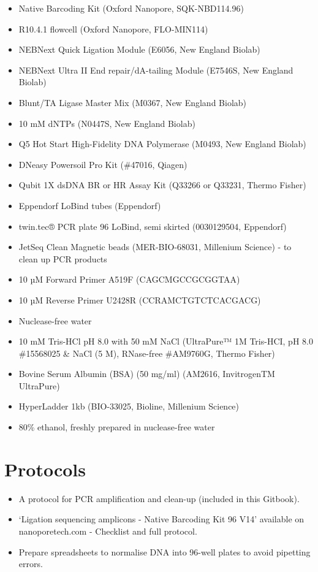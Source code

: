 \documentclass[
]{book}
\providecommand{\tightlist}{%
  \setlength{\itemsep}{0pt}\setlength{\parskip}{0pt}}
\begin{document}
\begin{itemize}
\tightlist
\item
  Native Barcoding Kit (Oxford Nanopore, SQK-NBD114.96)\\
\item
  R10.4.1 flowcell (Oxford Nanopore, FLO-MIN114)
\item
  NEBNext Quick Ligation Module (E6056, New England Biolab)
\item
  NEBNext Ultra II End repair/dA-tailing Module (E7546S, New England Biolab)
\item
  Blunt/TA Ligase Master Mix (M0367, New England Biolab)
\item
  10 mM dNTPs (N0447S, New England Biolab)
\item
  Q5 Hot Start High-Fidelity DNA Polymerase (M0493, New England Biolab)
\item
  DNeasy Powersoil Pro Kit (\#47016, Qiagen)
\item
  Qubit 1X dsDNA BR or HR Assay Kit (Q33266 or Q33231, Thermo Fisher)
\item
  Eppendorf LoBind tubes (Eppendorf)
\item
  twin.tec® PCR plate 96 LoBind, semi skirted (0030129504, Eppendorf)
\item
  JetSeq Clean Magnetic beads (MER-BIO-68031, Millenium Science) - to clean up PCR products
\item
  10 µM Forward Primer A519F (CAGCMGCCGCGGTAA) \citep{Martijn2019}
\item
  10 µM Reverse Primer U2428R (CCRAMCTGTCTCACGACG) \citep{Martijn2019}
\item
  Nuclease-free water
\item
  10 mM Tris-HCl pH 8.0 with 50 mM NaCl (UltraPure™ 1M Tris-HCI, pH 8.0 \#15568025 \& NaCl (5 M), RNase-free \#AM9760G, Thermo Fisher)
\item
  Bovine Serum Albumin (BSA) (50 mg/ml) (AM2616, InvitrogenTM UltraPure)
\item
  HyperLadder 1kb (BIO-33025, Bioline, Millenium Science)
\item
  80\% ethanol, freshly prepared in nuclease-free water
\end{itemize}

\section{Protocols}\label{protocols}

\begin{itemize}
\tightlist
\item
  A protocol for PCR amplification and clean-up (included in this Gitbook).
\item
  `Ligation sequencing amplicons - Native Barcoding Kit 96 V14' available on nanoporetech.com - Checklist and full protocol.
\item
  Prepare spreadsheets to normalise DNA into 96-well plates to avoid pipetting errors.
\end{itemize}
\end{document}
